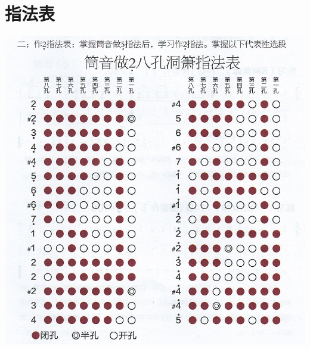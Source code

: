 \documentclass[cn,pad,chinese,chinesefont=nofont]{elegantbook}
\begin{document}
\section{指法表}
\includegraphics[width=\textwidth]{dongxiao/Scan 4.1.jpeg}
\end{document}
